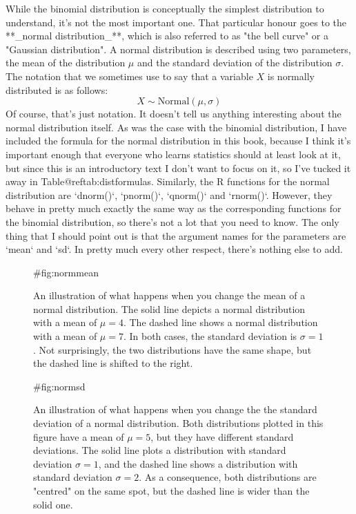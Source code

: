 While the binomial distribution is conceptually the simplest distribution to understand, it's not the most important one. That particular honour goes to the **_normal distribution_**, which is also referred to as "the bell curve" or a "Gaussian distribution". A normal distribution is described using two parameters, the mean of the distribution $\mu$ and the standard deviation of the distribution $\sigma$. The notation that we sometimes use to say that a variable $X$ is normally distributed is as follows:
$$
X \sim \mbox{Normal}(\mu,\sigma)
$$
Of course, that's just notation. It doesn't tell us anything interesting about the normal distribution itself. As was the case with the binomial distribution, I have included the formula for the normal distribution in this book, because I think it's important enough that everyone who learns statistics should at least look at it, but since this is an introductory text I don't want to focus on it, so I've tucked it away in Table@reftab:distformulas. Similarly, the R functions for the normal distribution are `dnorm()`, `pnorm()`, `qnorm()` and `rnorm()`. However, they behave in pretty much exactly the same way as the corresponding functions for the binomial distribution, so there's not a lot that you need to know. The only thing that I should point out is that the argument names for the parameters are `mean` and `sd`. In pretty much every other respect, there's nothing else to add.


\begin{figure}[t]
\begin{center}
\caption{An illustration of what happens when you change the mean of a normal distribution. The solid line depicts a normal distribution with a mean of $\mu=4$. The dashed line shows a normal distribution with a mean of $\mu=7$. In both cases, the standard deviation is $\sigma=1$. Not surprisingly, the two distributions have the same shape, but the dashed line is shifted to the right.}
{#fig:normmean}
\HR
\end{center}
\end{figure}



\begin{figure}[t]
\begin{center}
\caption{An illustration of what happens when you change the the standard deviation of a normal distribution. Both distributions plotted in this figure have a mean of $\mu = 5$, but they have different standard deviations. The solid line plots a distribution with standard deviation $\sigma=1$, and the dashed line shows a distribution with standard deviation $\sigma = 2$. As a consequence, both distributions are "centred" on the same spot, but the dashed line is wider than the solid one.}
{#fig:normsd}
\HR
\end{center}
\end{figure}

